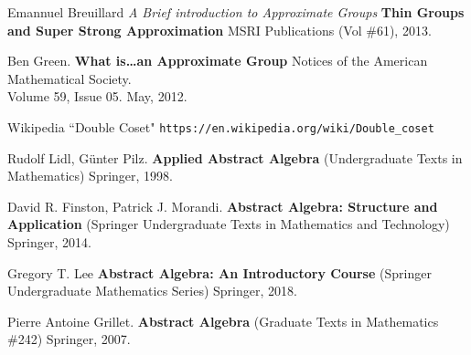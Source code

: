 \documentclass[12pt]{article}
\begin{document}
\begin{thebibliography}{} 

\item Emannuel Breuillard \textit{A Brief introduction to Approximate Groups} 
\textbf{Thin Groups and Super Strong Approximation} MSRI Publications (Vol \#61), 2013. 

\item Ben Green. \textbf{What is\dots an Approximate Group} Notices of the American Mathematical Society. \\  Volume 59, Issue 05. May, 2012.

\item Wikipedia ``Double Coset" \texttt{https://en.wikipedia.org/wiki/Double\_{}coset} 

\item Rudolf Lidl, G\"{u}nter Pilz.  \textbf{Applied Abstract Algebra} (Undergraduate Texts in Mathematics) Springer, 1998.

\item David R. Finston, Patrick J. Morandi. \textbf{Abstract Algebra: Structure and Application} (Springer Undergraduate Texts in Mathematics and Technology) Springer, 2014.

\item Gregory T. Lee \textbf{Abstract Algebra: An Introductory Course} (Springer Undergraduate Mathematics Series) Springer, 2018.

\item Pierre Antoine Grillet. \textbf{Abstract Algebra} (Graduate Texts in Mathematics \#242) Springer, 2007.


\end{thebibliography}

\newpage
\end{document}
